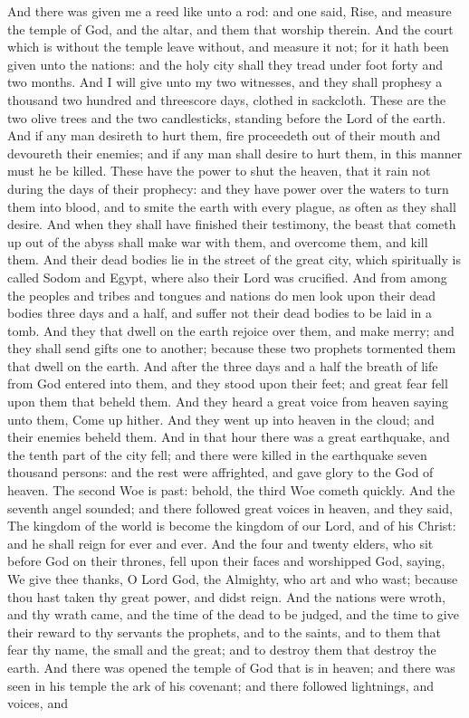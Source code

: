 And there was given me a reed like unto a rod: and one said, Rise, and measure the temple of God, and the altar, and them that worship therein. And the court which is without the temple leave without, and measure it not; for it hath been given unto the nations: and the holy city shall they tread under foot forty and two months. And I will give unto my two witnesses, and they shall prophesy a thousand two hundred and threescore days, clothed in sackcloth. These are the two olive trees and the two candlesticks, standing before the Lord of the earth. And if any man desireth to hurt them, fire proceedeth out of their mouth and devoureth their enemies; and if any man shall desire to hurt them, in this manner must he be killed. These have the power to shut the heaven, that it rain not during the days of their prophecy: and they have power over the waters to turn them into blood, and to smite the earth with every plague, as often as they shall desire. And when they shall have finished their testimony, the beast that cometh up out of the abyss shall make war with them, and overcome them, and kill them. And their dead bodies lie in the street of the great city, which spiritually is called Sodom and Egypt, where also their Lord was crucified. And from among the peoples and tribes and tongues and nations do men look upon their dead bodies three days and a half, and suffer not their dead bodies to be laid in a tomb. And they that dwell on the earth rejoice over them, and make merry; and they shall send gifts one to another; because these two prophets tormented them that dwell on the earth. And after the three days and a half the breath of life from God entered into them, and they stood upon their feet; and great fear fell upon them that beheld them. And they heard a great voice from heaven saying unto them, Come up hither. And they went up into heaven in the cloud; and their enemies beheld them. And in that hour there was a great earthquake, and the tenth part of the city fell; and there were killed in the earthquake seven thousand persons: and the rest were affrighted, and gave glory to the God of heaven.  The second Woe is past: behold, the third Woe cometh quickly.  And the seventh angel sounded; and there followed great voices in heaven, and they said, The kingdom of the world is become the kingdom of our Lord, and of his Christ: and he shall reign for ever and ever.  And the four and twenty elders, who sit before God on their thrones, fell upon their faces and worshipped God, saying, We give thee thanks, O Lord God, the Almighty, who art and who wast; because thou hast taken thy great power, and didst reign. And the nations were wroth, and thy wrath came, and the time of the dead to be judged, and the time to give their reward to thy servants the prophets, and to the saints, and to them that fear thy name, the small and the great; and to destroy them that destroy the earth.  And there was opened the temple of God that is in heaven; and there was seen in his temple the ark of his covenant; and there followed lightnings, and voices, and 